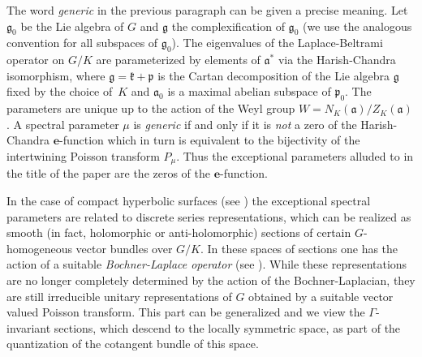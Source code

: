 \documentclass[JEP,XML,SOM,NoFloatCountersInSection,Unicode,published]{cedram}
\theoremstyle{definition}
\begin{document}
The word \emph{generic} in the previous paragraph can be given a precise meaning. Let~$\mathfrak g_0$ be the Lie algebra of $G$ and $\mathfrak g$ the complexification of $\mathfrak g_0$ (we use the analogous convention for all subspaces of $\mathfrak g_0$). The eigenvalues of the Laplace-Beltrami operator on $G/K$ are parameterized by elements of $\mathfrak a^*$ via the Harish-Chandra isomorphism, where $\mathfrak g=\mathfrak k+\mathfrak p$ is the Cartan decomposition of the Lie algebra $\mathfrak g$ fixed by the choice of~$K$ and $\mathfrak a_0$ is a maximal abelian subspace of $\mathfrak p_0$. The parameters are unique up to the action of the Weyl group $W=N_K(\mathfrak a)/Z_K(\mathfrak a)$. A spectral parameter $\mu$ is \emph{generic} if and only if it is \emph{not} a zero of the Harish-Chandra $\mathbf e$-function which in turn is equivalent to the bijectivity of the intertwining Poisson transform $P_\mu$. Thus the exceptional parameters alluded to in the title of the paper are the zeros of the $\mathbf e$-function.\enlargethispage{.5\baselineskip}

In the case of compact hyperbolic surfaces (see \cite{GHWa}) the exceptional spectral parameters are related to discrete series representations, which can be realized as smooth (in fact, holomorphic or anti-holomorphic) sections of certain $G$-homogeneous vector bundles over $G/K$. In these spaces of sections one has the action of a suitable \emph{Bochner-Laplace operator} (see \cite[Lem.\,2.2]{Ol}).
While these representations are no longer completely determined by the action of the Bochner-Laplacian, they are still irreducible unitary representations of $G$ obtained by a suitable vector valued Poisson transform. This part can be generalized and we view the $\Gamma$-invariant sections, which descend to the locally symmetric space, as part of the quantization of the cotangent bundle of this space.
\end{document}
